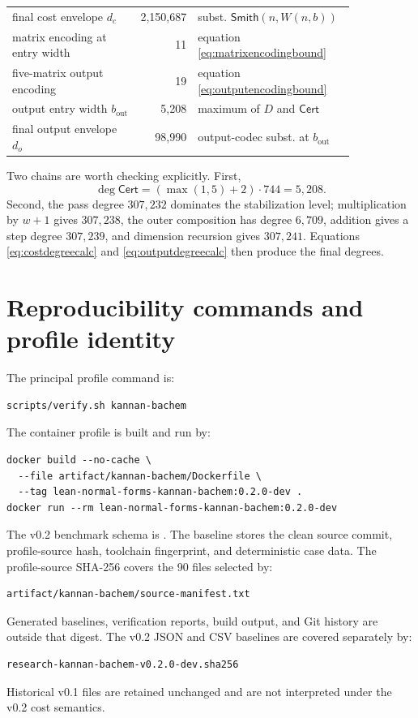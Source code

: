 \documentclass[11pt]{article}
\theoremstyle{definition}
\newcommand{\code}[1]{\texttt{\detokenize{#1}}}
\begin{document}
\begin{longtable}{@{}p{0.38\linewidth}r p{0.46\linewidth}@{}}
final cost envelope $d_c$ & 2,150,687 & subst. $\mathsf{Smith}(n,W(n,b))$ \\
matrix encoding at entry width & 11 & equation \eqref{eq:matrixencodingbound} \\
five-matrix output encoding & 19 & equation \eqref{eq:outputencodingbound} \\
output entry width $b_{\mathrm{out}}$ & 5,208 & maximum of $D$ and $\mathsf{Cert}$ \\
final output envelope $d_o$ & 98,990 & output-codec subst. at $b_{\mathrm{out}}$ \\
\bottomrule
\end{longtable}

Two chains are worth checking explicitly.  First,
\[
 \deg\mathsf{Cert}=(\max(1,5)+2)\cdot744=5{,}208.
\]
Second, the pass degree $307{,}232$ dominates the stabilization level; multiplication by $w+1$ gives $307{,}238$, the outer composition has degree $6{,}709$, addition gives a step degree $307{,}239$, and dimension recursion gives
$307{,}241$.  Equations \eqref{eq:costdegreecalc} and
\eqref{eq:outputdegreecalc} then produce the final degrees.

\section{Reproducibility commands and profile identity}
\label{app:repro}

The principal profile command is:
\begin{lstlisting}[language={}]
scripts/verify.sh kannan-bachem
\end{lstlisting}
The container profile is built and run by:
\begin{lstlisting}[language={}]
docker build --no-cache \
  --file artifact/kannan-bachem/Dockerfile \
  --tag lean-normal-forms-kannan-bachem:0.2.0-dev .
docker run --rm lean-normal-forms-kannan-bachem:0.2.0-dev
\end{lstlisting}
The v0.2 benchmark schema is
\code{normalforms.kannan-bachem-benchmark/v2}.  The baseline stores the clean source commit, profile-source hash, toolchain fingerprint, and deterministic case data.  The profile-source SHA-256 covers the 90 files selected by:
\begin{lstlisting}[language={},basicstyle=\ttfamily\footnotesize]
artifact/kannan-bachem/source-manifest.txt
\end{lstlisting}
Generated baselines, verification reports, build output, and Git history are outside that digest.  The v0.2 JSON and CSV baselines are covered separately by:
\begin{lstlisting}[language={},basicstyle=\ttfamily\footnotesize]
research-kannan-bachem-v0.2.0-dev.sha256
\end{lstlisting}
Historical v0.1 files are retained unchanged and are not interpreted under the v0.2 cost semantics.
\end{document}
